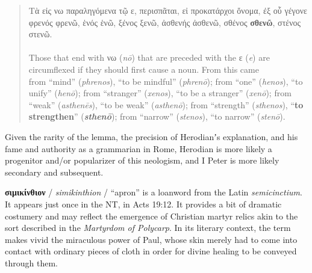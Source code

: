 \begin{quote}Τὰ εἰς νω παραληγόμενα τῷ ε, περισπᾶται, εἰ προκατάρχοι ὄνομα,
 ἐξ οὗ γέγονε \newline
 φρενός φρενῶ, \newline %
 ἑνός ἑνῶ, \newline %
 ξένος ξενῶ, \newline %
 ἀσθενής ἀσθενῶ, \newline %
 σθένος \textbf{σθενῶ}, \newline %
 στένος στενῶ. \\[1mm]%
\\[2mm] %
 Those that end with νω (\textit{nō}) that are preceded with the ε (\textit{e}) %
 are circumflexed if they should first cause a noun. %
 From this came \\[1mm]
 from “mind” (\textit{phrenos}), “to be mindful” (\textit{phrenō}); \newline
 from “one” (\textit{henos}), “to unify” (\textit{henō}); \newline
 from “stranger” (\textit{xenos}), “to be a stranger” (\textit{xenō}); \newline
 from “weak” (\textit{asthenēs}), “to be weak” (\textit{asthenō}); \newline
 from “strength” (\textit{sthenos}), “\textbf{to strengthen}” (\textit{\textbf{sthenō}}); \newline
 from “narrow” (\textit{stenos}), “to narrow” (\textit{stenō}). \\[1.5mm]
 \end{quote} %
 \vfill{}

\noindent{}Given the rarity of the lemma, the precision of Herodianʼs explanation, %
and his fame and authority as a grammarian in Rome, %
Herodian is more likely a progenitor and/or popularizer of this neologism, %
and I Peter is more likely secondary and subsequent. \clearpage

\noindent{}\textbf{σιμικίνθιον} / \textit{simikinthion} / “apron” %
is a loanword from the Latin \textit{semicinctium}. %
It appears just once in the NT, in Acts 19:12. %
It provides a bit of dramatic costumery %
and may reflect the emergence of Christian martyr relics %
akin to the sort described in the \textit{Martyrdom of Polycarp}. %
In its literary context, the term makes vivid the miraculous power of Paul, whose skin %
merely had to come into contact with ordinary pieces of cloth %
in order for divine healing to be conveyed through them. %

